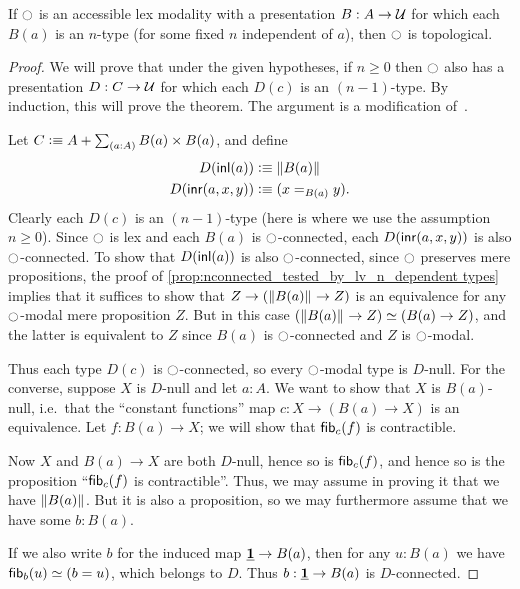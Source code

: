 \begin{thm}\label{thm:acc-ntypes-tpl}
  If ${\ocircle}$ is an accessible lex modality with a presentation $B:A\to\mathcal{U}$ for which each $B(a)$ is an $n$-type (for some fixed $n$ independent of $a$), then ${\ocircle}$ is topological.
\end{thm}
\begin{proof}
  We will prove that under the given hypotheses, if $n\ge 0$ then ${\ocircle}$ also has a presentation $D:C\to \mathcal{U}$ for which each $D(c)$ is an $(n-1)$-type.
  By induction, this will prove the theorem.
  The argument is a modification of~\cite[Lemma 7.5.11]{TheBook}.

  Let $C\defeq A + \sm{a:A} B(a)\times B(a)$, and define
  \begin{align*}
    D({\mathsf{inl}}(a)) &\vcentcolon\equiv \Vert B(a)\Vert_{}\\
    D({\mathsf{inr}}(a,x,y)) &\vcentcolon\equiv (x=_{B(a)} y).
  \end{align*}
  Clearly each $D(c)$ is an $(n-1)$-type (here is where we use the assumption $n\ge 0$).
  Since ${\ocircle}$ is lex and each $B(a)$ is ${\ocircle}$-connected, each $D({\mathsf{inr}}(a,x,y))$ is also ${\ocircle}$-connected.
  To show that $D({\mathsf{inl}}(a))$ is also ${\ocircle}$-connected, since ${\ocircle}$ preserves mere propositions, the proof of \cref{prop:nconnected_tested_by_lv_n_dependent types} implies that it suffices to show that $Z\to (\Vert B(a)\Vert_{} \to Z)$ is an equivalence for any ${\ocircle}$-modal mere proposition $Z$.
  But in this case $(\Vert B(a)\Vert_{} \to Z) \simeq (B(a) \to Z)$, and the latter is equivalent to $Z$ since $B(a)$ is ${\ocircle}$-connected and $Z$ is ${\ocircle}$-modal.

  Thus each type $D(c)$ is ${\ocircle}$-connected, so every ${\ocircle}$-modal type is $D$-null.
  For the converse, suppose $X$ is $D$-null and let $a:A$.
  We want to show that $X$ is $B(a)$-null, i.e.\ that the ``constant functions'' map $c : X\to (B(a) \to X)$ is an equivalence.
  Let $f:B(a) \to X$; we will show that $\mathsf{fib}_{c}(f)$ is contractible.

  Now $X$ and $B(a)\to X$ are both $D$-null, hence so is $\mathsf{fib}_{c}(f)$, and hence so is the proposition ``$\mathsf{fib}_{c}(f)$ is contractible''.
  Thus, we may assume in proving it that we have $\Vert B(a)\Vert_{}$.
  But it is also a proposition, so we may furthermore assume that we have some $b:B(a)$.

  If we also write $b$ for the induced map $\underline{\mathbf{1}} \to B(a)$, then for any $u:B(a)$ we have $\mathsf{fib}_{b}(u) \simeq (b=u)$, which belongs to $D$.
  Thus $b:\underline{\mathbf{1}}\to B(a)$ is $D$-connected.


\end{proof}
